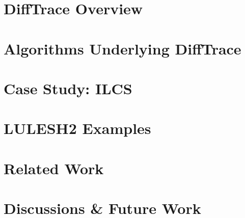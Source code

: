 \documentclass[conference]{IEEEtran}
\begin{document}
\section{DiffTrace Overview}
\label{sec:overview}


\section{ Algorithms Underlying DiffTrace}
\label{sec:algo}


\section{Case Study: ILCS}
\label{sec:ilcs-case-study}

%

\section{LULESH2 Examples}
\label{sec:lulesh}


\section{Related Work}
\label{sec:related}


\section{Discussions \& Future Work}
\label{sec:discussion}







%
\end{document}
